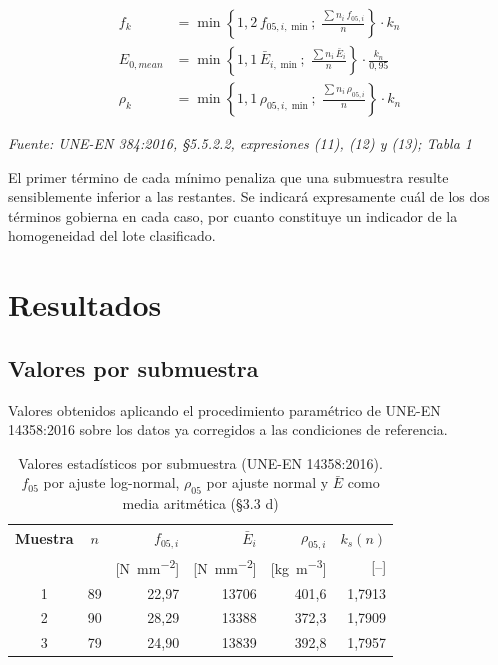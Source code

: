 \documentclass[11pt,a4paper]{article}
\newcommand{\fuente}[1]{{\small\textit{Fuente: #1}}}
\begin{document}
\begin{align}
f_{k} &= \min\left\{ 1{,}2\,f_{05,i,\min} ;\; \frac{\sum n_{i}\,f_{05,i}}{n} \right\}\cdot k_{n}
\tag{384-11}\label{eq:fk}\\[0.4em]
E_{0,mean} &= \min\left\{ 1{,}1\,\bar{E}_{i,\min} ;\; \frac{\sum n_{i}\,\bar{E}_{i}}{n} \right\}\cdot \frac{k_{n}}{0{,}95}
\tag{384-12}\label{eq:E0}\\[0.4em]
\rho_{k} &= \min\left\{ 1{,}1\,\rho_{05,i,\min} ;\; \frac{\sum n_{i}\,\rho_{05,i}}{n} \right\}\cdot k_{n}
\tag{384-13}\label{eq:rok}
\end{align}

\fuente{UNE-EN 384:2016, \S5.5.2.2, expresiones (11), (12) y (13); Tabla 1}

\medskip
\noindent El primer término de cada mínimo penaliza que una submuestra resulte
sensiblemente inferior a las restantes. Se indicará expresamente cuál de los dos
términos gobierna en cada caso, por cuanto constituye un indicador de la homogeneidad
del lote clasificado.

\section{Resultados}

\subsection{Valores por submuestra}
\label{sec:resultados_sub}

Valores obtenidos aplicando el procedimiento paramétrico de UNE-EN 14358:2016 sobre
los datos ya corregidos a las condiciones de referencia.

\begin{table}[H]
\centering
\caption[Valores estadísticos por submuestra (UNE-EN 14358:2016)]{Valores estadísticos por submuestra (UNE-EN 14358:2016). $f_{05}$ por ajuste log-normal, $\rho_{05}$ por ajuste normal y $\bar{E}$ como media aritmética (\S3.3 d)}
\begin{tabular}{c c r r r r}
\toprule
\textbf{Muestra} & \textbf{$n$} & \textbf{$f_{05,i}$} & \textbf{$\bar{E}_{i}$} & \textbf{$\rho_{05,i}$} & \textbf{$k_{s}(n)$} \\
 & & [\si{\newton\per\square\milli\meter}] & [\si{\newton\per\square\milli\meter}] & [\si{\kilo\gram\per\cubic\meter}] & [--] \\
\midrule
1 & 89 & 22,97 & 13706 & 401,6 & 1,7913 \\
2 & 90 & 28,29 & 13388 & 372,3 & 1,7909 \\
3 & 79 & 24,90 & 13839 & 392,8 & 1,7957 \\
\bottomrule
\end{tabular}
\end{table}
\end{document}
